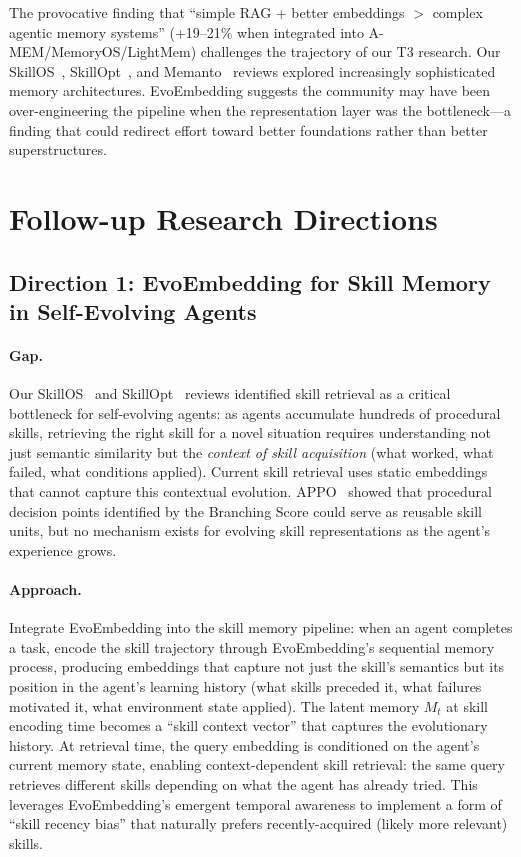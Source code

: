 \documentclass[11pt,a4paper]{article}
\begin{document}
The provocative finding that ``simple RAG + better embeddings $>$ complex agentic memory systems'' (+19--21\% when integrated into A-MEM/MemoryOS/LightMem) challenges the trajectory of our T3 research. Our SkillOS~\cite{chen2026skillos}, SkillOpt~\cite{li2026skillopt}, and Memanto~\cite{aoki2026memanto} reviews explored increasingly sophisticated memory architectures. EvoEmbedding suggests the community may have been over-engineering the pipeline when the representation layer was the bottleneck---a finding that could redirect effort toward better foundations rather than better superstructures.

\section{Follow-up Research Directions}

\subsection{Direction 1: EvoEmbedding for Skill Memory in Self-Evolving Agents}

\paragraph{Gap.} Our SkillOS~\cite{chen2026skillos} and SkillOpt~\cite{li2026skillopt} reviews identified skill retrieval as a critical bottleneck for self-evolving agents: as agents accumulate hundreds of procedural skills, retrieving the right skill for a novel situation requires understanding not just semantic similarity but the \emph{context of skill acquisition} (what worked, what failed, what conditions applied). Current skill retrieval uses static embeddings that cannot capture this contextual evolution. APPO~\cite{wang2026appo} showed that procedural decision points identified by the Branching Score could serve as reusable skill units, but no mechanism exists for evolving skill representations as the agent's experience grows.

\paragraph{Approach.} Integrate EvoEmbedding into the skill memory pipeline: when an agent completes a task, encode the skill trajectory through EvoEmbedding's sequential memory process, producing embeddings that capture not just the skill's semantics but its position in the agent's learning history (what skills preceded it, what failures motivated it, what environment state applied). The latent memory $M_t$ at skill encoding time becomes a ``skill context vector'' that captures the evolutionary history. At retrieval time, the query embedding is conditioned on the agent's current memory state, enabling context-dependent skill retrieval: the same query retrieves different skills depending on what the agent has already tried. This leverages EvoEmbedding's emergent temporal awareness to implement a form of ``skill recency bias'' that naturally prefers recently-acquired (likely more relevant) skills.
\end{document}
